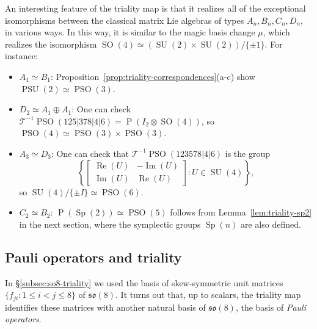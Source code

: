 \documentclass[reqno]{amsart}
\theoremstyle{definition} \newtheorem{example}[theorem]{Example}
\newcommand{\PSU}{\operatorname{PSU}}
\newcommand{\SU}{\operatorname{SU}}
\newcommand{\SO}{\operatorname{SO}}
\newcommand{\PSO}{\operatorname{PSO}}
\newcommand{\Sp}{\operatorname{Sp}}
\newcommand{\so}{\mathfrak{so}}
\renewcommand{\Re}{\operatorname{Re}}
\renewcommand{\Im}{\operatorname{Im}}
\renewcommand{\P}{\operatorname{P}}
\newcommand{\secsymbol}{§}
\newcommand{\T}{\mathcal{T}}
\begin{document}
An interesting feature of the triality map is that it realizes all of the exceptional isomorphisms between the classical matrix Lie algebras of types $A_n, B_n, C_n, D_n$, in various ways. In this way, it is similar to the magic basis change $\mu$, which realizes the isomorphism $\SO(4) \simeq (\SU(2) \times \SU(2))/\{\pm 1\}$. For instance:
\begin{itemize}
\item $A_1 \simeq B_1$: Proposition~\ref{prop:triality-correspondences}(a-c) show $\PSU(2) \simeq \PSO(3)$.
\item $D_2 \simeq A_1 \oplus A_1$: One can check $\T^{-1}\PSO(125|378|4|6) = \P(I_2 \otimes \SO(4))$, so $\PSO(4) \simeq \PSO(3) \times \PSO(3)$.
\item $A_3 \simeq D_3$: One can check that $\T^{-1}\PSO(123578|4|6)$ is the group
\begin{equation*}
\left\{ \left[\begin{smallmatrix} \Re(U) & -\Im(U) \\ \Im(U) & \Re(U) \end{smallmatrix} \right] : U \in \SU(4) \right\},
\end{equation*}
so $\SU(4) / \{\pm I\} \simeq \PSO(6)$.
\item $C_2 \simeq B_2$: $\P(\Sp(2)) \simeq \PSO(5)$ follows from Lemma~\ref{lem:triality-sp2} in the next section, where the symplectic groups $\Sp(n)$ are also defined.
\end{itemize}



\subsection{Pauli operators and triality} \label{subsec:pauli} 
In \secsymbol\ref{subsec:so8-triality} we used the basis of skew-symmetric unit matrices $\{f_{ji} : 1 \leq i < j \leq 8\}$ of $\so(8)$. It turns out that, up to scalars, the triality map identifies these matrices with another natural basis of $\so(8)$, the basis of \emph{Pauli operators}.
\end{document}
